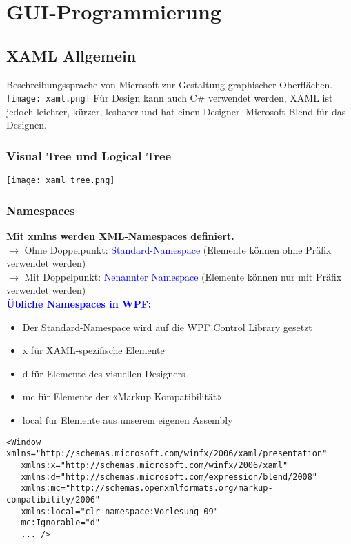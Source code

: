 
\section{GUI-Programmierung}
\subsection{XAML Allgemein}
Beschreibungssprache von Microsoft zur Gestaltung graphischer Oberflächen.\\
\texttt{[image: xaml.png]}
Für Design kann auch C\# verwendet werden, XAML ist jedoch leichter, kürzer, lesbarer und hat einen Designer. Microsoft Blend für das Designen.
\subsubsection{Visual Tree und Logical Tree}
\texttt{[image: xaml\_tree.png]}
\subsubsection{Namespaces}
\textbf{Mit xmlns werden XML-Namespaces definiert.}\\
$\rightarrow$ Ohne Doppelpunkt: \textcolor{blue}{Standard-Namespace} (Elemente können ohne Präfix verwendet werden)\\
$\rightarrow$ Mit Doppelpunkt: \textcolor{blue}{Nenannter Namespace} (Elemente können nur mit Präfix verwendet werden)\\
\textbf{\textcolor{blue}{Übliche Namespaces in WPF:}}
\begin{itemize}[topsep=0pt, leftmargin=4mm]
    \setlength\itemsep{-0.3em}
    \item Der Standard-Namespace wird auf die WPF Control Library gesetzt
    \item x für XAML-spezifische Elemente
    \item d für Elemente des visuellen Designers
    \item mc für Elemente der «Markup Kompatibilität»
    \item local für Elemente aus unserem eigenen Assembly
\end{itemize}
\begin{lstlisting}
<Window xmlns="http://schemas.microsoft.com/winfx/2006/xaml/presentation"
   xmlns:x="http://schemas.microsoft.com/winfx/2006/xaml"
   xmlns:d="http://schemas.microsoft.com/expression/blend/2008"
   xmlns:mc="http://schemas.openxmlformats.org/markup-compatibility/2006"
   xmlns:local="clr-namespace:Vorlesung_09"
   mc:Ignorable="d"
   ... />
\end{lstlisting}
